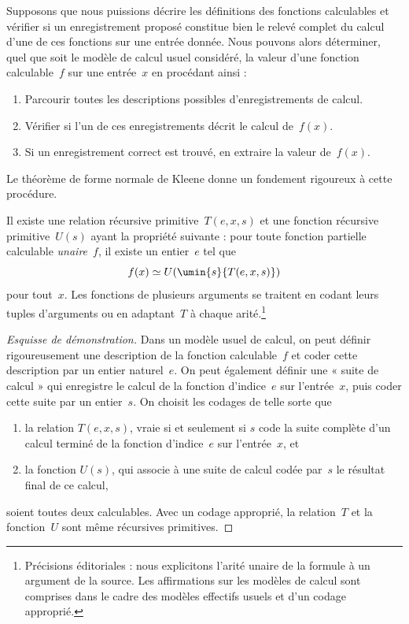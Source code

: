 \documentclass[../../../include/open-logic-section]{subfiles}
\begin{document}

Supposons que nous puissions décrire les définitions des
fonctions calculables et vérifier si un enregistrement
proposé constitue bien le relevé complet du calcul d'une
de ces fonctions sur une entrée donnée. Nous pouvons
alors déterminer, quel que soit le modèle de calcul
usuel considéré, la valeur d'une fonction calculable~$f$
sur une entrée~$x$ en procédant ainsi :
\begin{enumerate}
  \item Parcourir toutes les descriptions possibles
  d'enregistrements de calcul.
  \item Vérifier si l'un de ces enregistrements décrit
  le calcul de~$f(x)$.
  \item Si un enregistrement correct est trouvé,
  en extraire la valeur de~$f(x)$.
\end{enumerate}
Le théorème de forme normale de Kleene donne un
fondement rigoureux à cette procédure.

\begin{thm}
Il existe une relation récursive primitive~$T(e,x,s)$
et une fonction récursive primitive~$U(s)$ ayant la
propriété suivante : pour toute fonction partielle
calculable \emph{unaire}~$f$, il existe un entier~$e$ tel que
\[
f(x) \simeq U(\umin{s}{T(e, x, s)})
\]
pour tout~$x$. Les fonctions de plusieurs arguments
se traitent en codant leurs tuples d'arguments ou
en adaptant~$T$ à chaque arité.\footnote{Précisions éditoriales : nous explicitons l'arité unaire de la formule à un argument de la source. Les affirmations sur les modèles de calcul sont comprises dans le cadre des modèles effectifs usuels et d'un codage approprié.}
\end{thm}

\begin{proof}[Esquisse de démonstration]
Dans un modèle usuel de calcul, on peut définir
rigoureusement une description de la fonction
calculable~$f$ et coder cette description par un
entier naturel~$e$. On peut également définir une
« suite de calcul » qui enregistre le calcul de la
fonction d'indice~$e$ sur l'entrée~$x$, puis coder
cette suite par un entier~$s$. On choisit les codages
de telle sorte que
\begin{enumerate}
  \item la relation $T(e,x,s)$, vraie si et seulement
  si $s$ code la suite complète d'un calcul terminé de la fonction
  d'indice~$e$ sur l'entrée~$x$, et
  \item la fonction $U(s)$, qui associe à une suite
  de calcul codée par~$s$ le résultat final
  de ce calcul,
\end{enumerate}
soient toutes deux calculables. Avec un codage
approprié, la relation~$T$ et la fonction~$U$
sont même récursives primitives.
\end{proof}
\end{document}
